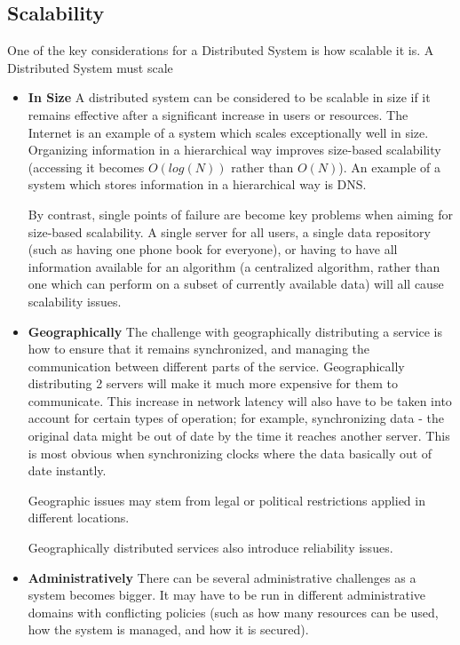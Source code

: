 \documentclass{article}
\begin{document}
\subsection{Scalability}
One of the key considerations for a Distributed System is how scalable it is. A Distributed System must scale 
\begin{itemize}
    \item \textbf{In Size}
    A distributed system can be considered to be scalable in size if it remains effective after a significant increase in users or resources. The Internet is an example of a system which scales exceptionally well in size. Organizing information in a hierarchical way improves size-based scalability (accessing it becomes $O(log(N))$ rather than $O(N)$). An example of a system which stores information in a hierarchical way is DNS. 

    By contrast, single points of failure are become key problems when aiming for size-based scalability. A single server for all users, a single data repository (such as having one phone book for everyone), or having to have all information available for an algorithm (a centralized algorithm, rather than one which can perform on a subset of currently available data) will all cause scalability issues.
    \item \textbf{Geographically}
    The challenge with geographically distributing a service is how to ensure that it remains synchronized, and managing the communication between different parts of the service. Geographically distributing 2 servers will make it much more expensive for them to communicate. This increase in network latency will also have to be taken into account for certain types of operation; for example, synchronizing data - the original data might be out of date by the time it reaches another server. This is most obvious when synchronizing clocks where the data basically out of date instantly. 

    Geographic issues may stem from legal or political restrictions applied in different locations.

    Geographically distributed services also introduce reliability issues.
    \item \textbf{Administratively}
    There can be several administrative challenges as a system becomes bigger. It may have to be run in different administrative domains with conflicting policies (such as how many resources can be used, how the system is managed, and how it is secured). 
\end{itemize}
\end{document}
